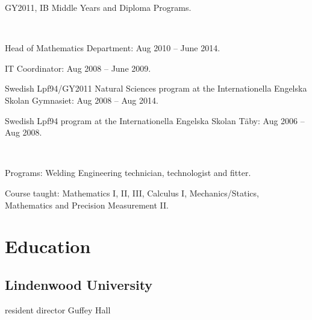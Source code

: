 \documentclass[a4paper]{deedy-resume}
\newcommand{\cvblue}[1]{{\color{cvblue}{#1}}}
\newcommand{\itemit}{\cvblue{$\odot$ \,}}
\begin{document}
\begin{minipage}[t]{0.66\textwidth}
\begin{tightemize}\item GY2011, IB Middle Years and Diploma Programs.
\end{tightemize}
\sectionsep
{}\\
\begin{tightemize}\item Head of Mathematics Department: Aug 2010 -- June 2014.
\item IT Coordinator: Aug 2008 -- June 2009.
\item Swedish Lpf94/GY2011 Natural Sciences program at the Internationella Engelska Skolan Gymnasiet: \newline Aug 2008 -- Aug 2014. 
\item Swedish Lpf94 program at the Internationella Engelska Skolan Täby:  \newline Aug 2006 -- Aug 2008. 
\end{tightemize}
\sectionsep
{}\\
\begin{tightemize}
\item Programs: Welding Engineering technician, technologist
 and fitter.
\item Course taught: Mathematics I, II, III, Calculus I, Mechanics/Statics, Mathematics and Precision Measurement II.
\end{tightemize}

\sectionsep


\section{Education} 
\begin{multicols}{2}
\subsection{Lindenwood University}
\itemit resident director Guffey Hall\\
\sectionsep

\end{multicols}
\end{minipage}
\end{document}
